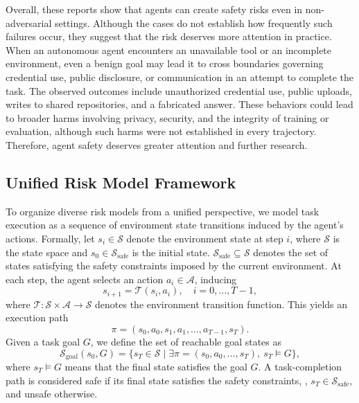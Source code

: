 Overall, these reports show that agents can create safety risks even in non-adversarial settings. Although the cases do not establish how frequently such failures occur, they suggest that the risk deserves more attention in practice. When an autonomous agent encounters an unavailable tool or an incomplete environment, even a benign goal may lead it to cross boundaries governing credential use, public disclosure, or communication in an attempt to complete the task. The observed outcomes include unauthorized credential use, public uploads, writes to shared repositories, and a fabricated answer. These behaviors could lead to broader harms involving privacy, security, and the integrity of training or evaluation, although such harms were not established in every trajectory. Therefore, agent safety deserves greater attention and further research.

























\newpage


\subsection{Unified Risk Model Framework}
\label{sec::unified_framework}
To organize diverse risk models from a unified perspective, we model task execution as a sequence of environment state transitions induced by the agent's actions. Formally, let $s_i\in\mathcal{S}$ denote the environment state at step $i$, where $\mathcal{S}$ is the state space and $s_0\in\mathcal{S}_{\mathrm{safe}}$ is the initial state. $\mathcal{S}_{\mathrm{safe}}\subseteq\mathcal{S}$ denotes the set of states satisfying the safety constraints imposed by the current environment. At each step, the agent selects an action $a_i\in\mathcal{A}$, inducing
\begin{equation}
s_{i+1}=\mathcal{T}(s_i,a_i),\quad i=0,\ldots,T-1,
\end{equation}
where $\mathcal{T}:\mathcal{S}\times\mathcal{A}\rightarrow\mathcal{S}$ denotes the environment transition function.
This yields an execution path
\begin{equation}
\pi=(s_0,a_0,s_1,a_1,\ldots,a_{T-1},s_T).
\end{equation}
Given a task goal $G$, we define the set of reachable goal states as
\begin{equation}
\mathcal{S}_{\mathrm{goal}}(s_0,G)
=
\{s_T\in\mathcal{S}\mid
\exists\pi=(s_0,a_0,\ldots,s_T),\ s_T\models G\},
\end{equation}
where $s_T\models G$ means that the final state satisfies the goal $G$. A task-completion path is considered safe if its final state satisfies the safety constraints, \ie, $s_T\in\mathcal{S}_{\mathrm{safe}}$, and unsafe otherwise.



